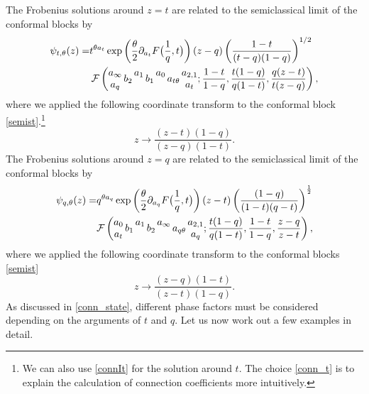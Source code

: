 \documentclass[11pt]{article}
\numberwithin{equation}{section}
\newcommand{\be}{\begin{equation}}
\newcommand{\ee}{\end{equation}}
\newcommand{\ba}{\begin{aligned}}
\newcommand{\ea}{\end{aligned}}
\begin{document}
The Frobenius solutions around $z=t$ are related to the semiclassical limit of the conformal blocks by
\be\ba
\label{conn_t}\psi_{t,\theta}(z)=&t^{\theta a_t}\exp\left(\frac{\theta}{2}\partial_{a_t}F\big({1\over q},t\big)\right)
(z-q)\left(\frac{1-t}{(t-q)(1-q)}\right)^{1/2}\\
&\,\mathcal{F}\left( \begin{matrix} a_{\infty} \\ a_{q} \end{matrix} \, b_2 \, \begin{matrix} a_1  \\ \, \end{matrix} \,b_1 \, \begin{matrix} a_0 \\ \, \end{matrix} \,a_{t\theta} \, \begin{matrix} a_{2,1} \\ a_t \end{matrix} ; \frac{1-t}{1-q}, \frac{t(1-q)}{q(1-t)}, \frac{q(z-t)}{t(z-q)} \right),
\ea\ee
where we applied the following coordinate transform to the conformal block \eqref{semist}.\footnote{We can also use \eqref{connIt} for the solution around $t$. The choice \eqref{conn_t} is to explain the calculation of connection coefficients more intuitively.}
\begin{equation}
z\rightarrow\frac{(z-t)(1-q)}{(z-q)(1-t)}.
\end{equation}
%
The Frobenius solutions around $z=q$ are related to the semiclassical limit of the conformal blocks by
\be\ba
\label{conn_q}\psi_{q,\theta}(z)=&q^{\theta a_q}\exp\left(\frac{\theta}{2}\partial_{a_q}F\big({1\over q},t\big)\right)(z-t)\left(\frac{(1-q)}{(1-t)(q-t)}\right)^{\frac{1}{2}} \\
&\mathcal{F}\left( \begin{matrix} a_{0} \\ a_{t} \end{matrix} \, b_{1} \, \begin{matrix} a_{1}  \\ \, \end{matrix} \,b_{2} \, \begin{matrix} a_{\infty} \\ \, \end{matrix} \,a_{q\theta} \, \begin{matrix} a_{2,1} \\ a_{q} \end{matrix} ; \frac{t(1-q)}{q(1-t)},\frac{1-t}{1-q}, \frac{z-q}{z-t}\right),
\ea\ee
where we applied the following coordinate transform to the conformal blocks \eqref{semist} 
\be z\rightarrow\frac{(z-q)(1-t)}{(z-t)(1-q)}. \ee
%
As discussed in \eqref{conn_state}, different phase factors must be considered depending on the arguments of  $t$  and  $q$.  Let us now work out a few examples in detail.
\end{document}
